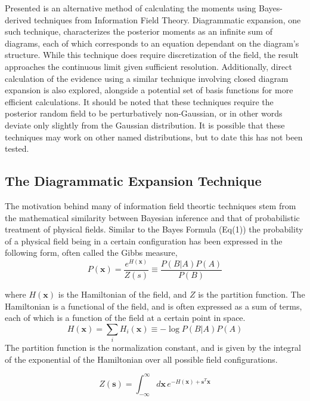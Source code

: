 \documentclass[letterpaper,12pt]{article}
\begin{document}
Presented is an alternative method of calculating the moments using Bayes-derived techniques from Information Field Theory. Diagrammatic expansion, one such technique, characterizes the posterior moments as an infinite sum of diagrams, each of which corresponds to an equation dependant on the diagram's structure. While this technique does require discretization of the field, the result approaches the continuous limit given sufficient resolution. Additionally, direct calculation of the evidence using a similar technique involving closed diagram expansion is also explored, alongside a potential set of basis functions for more efficient calculations. It should be noted that these techniques require the posterior random field to be perturbatively non-Gaussian, or in other words deviate only slightly from the Gaussian distribution. It is possible that these techniques may work on other named distributions, but to date this has not been tested. 
\subsection{The Diagrammatic Expansion Technique}

The motivation behind many of information field theortic techniques stem from the mathematical similarity between Bayesian inference and that of probabilistic treatment of physical fields. Similar to the Bayes Formula (Eq(1)) the probability of a physical field being in a certain
configuration has been expressed in the following form, often called the Gibbs measure,
\begin{equation}
    P(\bm{x}) = \frac{e^{H(\bm{x})}}{Z(s)} \equiv \frac{P(B | A)P(A)}{P(B)}
\end{equation}

where $H(\bm{x})$ is the Hamiltonian of the field, and $Z$ is the partition function. 
The Hamiltonian is a functional of the field, and is often expressed as a sum of terms, each of which is a function of the field at a certain point in space. 
\begin{equation}
    H(\bm{x}) = \sum_{i} H_{i}(\bm{x}) \equiv -\log P(B|A)P(A)
\end{equation}
The partition function is the normalization constant, and is given by the integral of the exponential of the Hamiltonian over all possible field configurations. 

\begin{equation}
    Z (\bm{s})= \int_{-\infty}^{\infty} d\bm{x} \, e^{-H(\bm{x}) + \bm{s}^{T}\bm{x}}
\end{equation}
\end{document}
